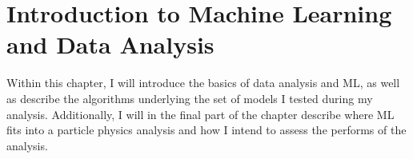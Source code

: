 \chapter{Introduction to Machine Learning and Data Analysis}\label{chap:Intro ML}
Within this chapter, I will introduce the basics of data analysis and \ac{ML}, as well as describe the 
algorithms underlying the set of models I tested during my analysis. Additionally, I will in the final part of the chapter 
describe where \ac{ML} fits into a particle physics analysis and how I intend to assess the performs of the analysis.

